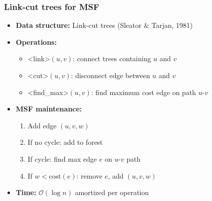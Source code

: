 \documentclass[fleqn]{beamer}
\newcommand{\Oh}{\mathcal{O}}
\def\texttt#1{<#1>}%
\begin{document}
\begin{frame}
    \frametitle{Link-cut trees for MSF}
    
    \begin{itemize}
    \item \textbf{Data structure:} Link-cut trees (Sleator \& Tarjan, 1981) \vfill
    \item \textbf{Operations:} \vfill
        \begin{itemize}
        \item \texttt{link}$(u,v)$: connect trees containing $u$ and $v$
        \item \texttt{cut}$(u,v)$: disconnect edge between $u$ and $v$
        \item \texttt{find\_max}$(u,v)$: find maximum cost edge on path $u$-$v$
        \end{itemize} \vfill\pause
    \item \textbf{MSF maintenance:} \vfill
        \begin{enumerate}
        \item Add edge $(u,v,w)$
        \item If no cycle: add to forest
        \item If cycle: find max edge $e$ on $u$-$v$ path
        \item If $w < \text{cost}(e)$: remove $e$, add $(u,v,w)$
        \end{enumerate} \vfill\pause
    \item \textbf{Time:} $\Oh(\log n)$ amortized per operation \vfill
    \end{itemize}
\end{frame}
\end{document}
